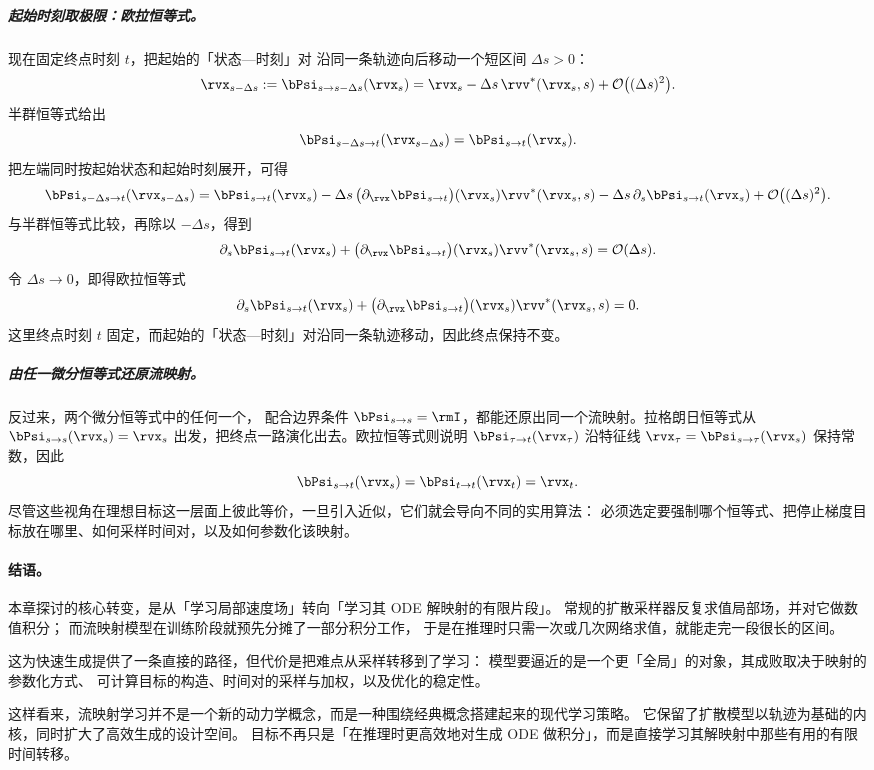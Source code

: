 \subparagraph{起始时刻取极限：欧拉恒等式。}现在固定终点时刻 $t$，把起始的「状态—时刻」对
沿同一条轨迹向后移动一个短区间 $\Delta s>0$：
\[
    \rvx_{s-\Delta s}
    :=
    \bPsi_{s\to s-\Delta s}(\rvx_s)
    =
    \rvx_s-\Delta s\,\rvv^*(\rvx_s,s)
    +\mathcal{O}\big((\Delta s)^2\big).
\]
半群恒等式给出
\[
    \bPsi_{s-\Delta s\to t}(\rvx_{s-\Delta s})
    =
    \bPsi_{s\to t}(\rvx_s).
\]
把左端同时按起始状态和起始时刻展开，可得
\[
    \bPsi_{s-\Delta s\to t}(\rvx_{s-\Delta s})
    =
    \bPsi_{s\to t}(\rvx_s)
    -
    \Delta s\,
    \big(\partial_{\rvx}\bPsi_{s\to t}\big)(\rvx_s)\rvv^*(\rvx_s,s)
    -
    \Delta s\,
    \partial_s\bPsi_{s\to t}(\rvx_s)
    +
    \mathcal{O}\big((\Delta s)^2\big).
\]
与半群恒等式比较，再除以 $-\Delta s$，得到
\[
    \partial_s\bPsi_{s\to t}(\rvx_s)
    +
    \big(\partial_{\rvx}\bPsi_{s\to t}\big)(\rvx_s)\rvv^*(\rvx_s,s)
    =
    \mathcal{O}(\Delta s).
\]
令 $\Delta s\to0$，即得欧拉恒等式
\[
    \partial_s\bPsi_{s\to t}(\rvx_s)
    +
    \big(\partial_{\rvx}\bPsi_{s\to t}\big)(\rvx_s)\rvv^*(\rvx_s,s)
    =
    0.
\]
这里终点时刻 $t$ 固定，而起始的「状态—时刻」对沿同一条轨迹移动，因此终点保持不变。

\subparagraph{由任一微分恒等式还原流映射。}
反过来，两个微分恒等式中的任何一个，
配合边界条件 $\bPsi_{s\to s}=\rmI$，都能还原出同一个流映射。拉格朗日恒等式从
$\bPsi_{s\to s}(\rvx_s)=\rvx_s$ 出发，把终点一路演化出去。欧拉恒等式则说明
$\bPsi_{\tau\to t}(\rvx_\tau)$ 沿特征线
$\rvx_\tau=\bPsi_{s\to \tau}(\rvx_s)$ 保持常数，因此
\[
    \bPsi_{s\to t}(\rvx_s)
    =
    \bPsi_{t\to t}(\rvx_t)
    =
    \rvx_t.
\]
尽管这些视角在理想目标这一层面上彼此等价，一旦引入近似，它们就会导向不同的实用算法：
必须选定要强制哪个恒等式、把停止梯度目标放在哪里、如何采样时间对，以及如何参数化该映射。


\paragraph{结语。}
本章探讨的核心转变，是从「学习局部速度场」转向「学习其 ODE 解映射的有限片段」。
常规的扩散采样器反复求值局部场，并对它做数值积分；
而流映射模型在训练阶段就预先分摊了一部分积分工作，
于是在推理时只需一次或几次网络求值，就能走完一段很长的区间。

这为快速生成提供了一条直接的路径，但代价是把难点从采样转移到了学习：
模型要逼近的是一个更「全局」的对象，其成败取决于映射的参数化方式、
可计算目标的构造、时间对的采样与加权，以及优化的稳定性。

这样看来，流映射学习并不是一个新的动力学概念，而是一种围绕经典概念搭建起来的现代学习策略。
它保留了扩散模型以轨迹为基础的内核，同时扩大了高效生成的设计空间。
目标不再只是「在推理时更高效地对生成 ODE 做积分」，而是直接学习其解映射中那些有用的有限时间转移。


